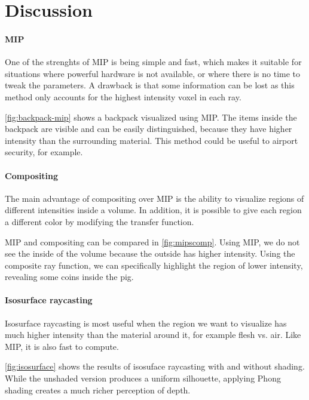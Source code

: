 \documentclass[a4paper]{article}
\begin{document}
\section{Discussion}
\label{discussion}

\paragraph{MIP}

One of the strenghts of MIP is being simple and fast, which makes it suitable for situations where powerful hardware is not available, or where there is no time to tweak the parameters. A drawback is that some information can be lost as this method only accounts for the highest intensity voxel in each ray.

\autoref{fig:backpack-mip} shows a backpack visualized using MIP. The items inside the backpack are visible and can be easily distinguished, because they have higher intensity than the surrounding material. This method could be useful to airport security, for example.

\paragraph{Compositing}

The main advantage of compositing over MIP is the ability to visualize regions of different intensities inside a volume. In addition, it is possible to give each region a different color by modifying the transfer function.

MIP and compositing can be compared in \autoref{fig:mipscomp}. Using MIP, we do not see the inside of the volume because the outside has higher intensity. Using the composite ray function, we can specifically highlight the region of lower intensity, revealing some coins inside the pig.

\paragraph{Isosurface raycasting}

Isosurface raycasting is most useful when the region we want to visualize has much higher intensity than the material around it, for example flesh vs. air. Like MIP, it is also fast to compute.

\autoref{fig:isosurface} shows the results of isosuface raycasting with and without shading. While the unshaded version produces a uniform silhouette, applying Phong shading creates a much richer perception of depth.
\end{document}
